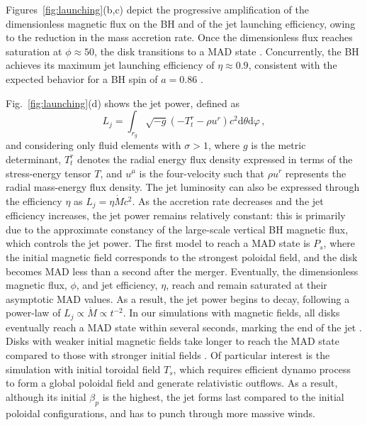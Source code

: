\documentclass[twocolumn,dvipsnames]{aastex62}
\begin{document}
Figures~\ref{fig:launching}(b,c) depict the progressive amplification of the dimensionless magnetic flux on the BH and of the jet launching efficiency, owing to the reduction in the mass accretion rate. Once the dimensionless flux reaches saturation at $ \phi \approx 50 $, the disk transitions to a MAD state \citep{Tchekhovskoy2011,2015ASSL..414...45T}. Concurrently, the BH achieves its maximum jet launching efficiency of $ \eta \approx 0.9 $, consistent with the expected behavior for a BH spin of $ a = 0.86 $ \citep{Lowell2023}.

Fig.~\ref{fig:launching}(d) shows the jet power, defined as
\begin{equation}
    L_j = \int_{r_g}\sqrt{-g}(-T^r_t-\rho u^r)c^2\mathrm{d}\theta \mathrm{d}\varphi\,,
\end{equation}
and considering only fluid elements with $ \sigma > 1 $, where $ g $ is the metric determinant, $ T^r_t $ denotes the radial energy flux density expressed in terms of the stress-energy tensor $ T $, and $ u^\mu $ is the four-velocity such that $ \rho u^r $ represents the radial mass-energy flux density. The jet luminosity can also be expressed through the efficiency $\eta$ as $ L_j = \eta\dot{M}c^2 $. As the accretion rate decreases and the jet efficiency increases, the jet power remains relatively constant: this is primarily due to the approximate constancy of the large-scale vertical BH magnetic flux, which controls the jet power. The first model to reach a MAD state is $ P_s $, where the initial magnetic field corresponds to the strongest poloidal field, and the disk becomes MAD less than a second after the merger. Eventually, the dimensionless magnetic flux, $\phi$, and jet efficiency, $ \eta $, reach and remain saturated at their asymptotic MAD values. As a result, the jet power begins to decay, following a power-law of $ L_j \propto \dot{M} \propto t^{-2} $. In our simulations with magnetic fields, all disks eventually reach a MAD state within several seconds, marking the end of the jet \citep[see][who explored a similar idea in the context of long GRBs]{Tchekhovskoy2015}. Disks with weaker initial magnetic fields take longer to reach the MAD state compared to those with stronger initial fields \citep[see also][]{Christie2019,Fernandez2019}. Of particular interest is the simulation with initial toroidal field $ T_s $, which requires efficient dynamo process to form a global poloidal field and generate relativistic outflows. As a result, although its initial $ \beta_p $ is the highest, the jet forms last compared to the initial poloidal configurations, and has to punch through more massive winds.
\end{document}
